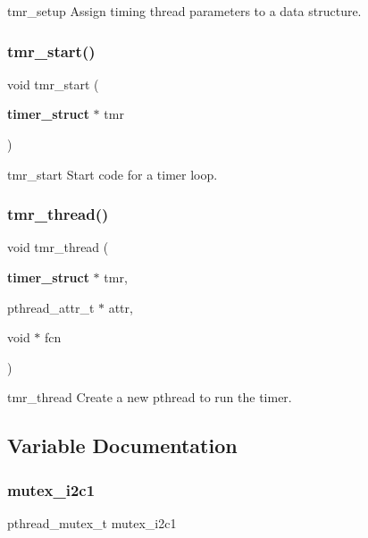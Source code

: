 tmr\+\_\+setup Assign timing thread parameters to a data structure. \mbox{\label{timer_8h_a4f4891597a529574d300197780997de7}} 
\subsubsection{tmr\+\_\+start()}
{\footnotesize\ttfamily void tmr\+\_\+start (\begin{DoxyParamCaption}\item[{\textbf{ timer\+\_\+struct} $\ast$}]{tmr }\end{DoxyParamCaption})}

tmr\+\_\+start Start code for a timer loop. \mbox{\label{timer_8h_a5e2ddc8c18fce17548fb74a99d25be03}} 
\subsubsection{tmr\+\_\+thread()}
{\footnotesize\ttfamily void tmr\+\_\+thread (\begin{DoxyParamCaption}\item[{\textbf{ timer\+\_\+struct} $\ast$}]{tmr,  }\item[{pthread\+\_\+attr\+\_\+t $\ast$}]{attr,  }\item[{void $\ast$}]{fcn }\end{DoxyParamCaption})}

tmr\+\_\+thread Create a new pthread to run the timer. 

\subsection{Variable Documentation}
\mbox{\label{timer_8h_a119c44b7690c88c05266505a475a4b7a}} 
\subsubsection{mutex\+\_\+i2c1}
{\footnotesize\ttfamily pthread\+\_\+mutex\+\_\+t mutex\+\_\+i2c1}

\mbox{\label{timer_8h_a2172e20a44c11be8e16cbe5dc6023d11}} 
